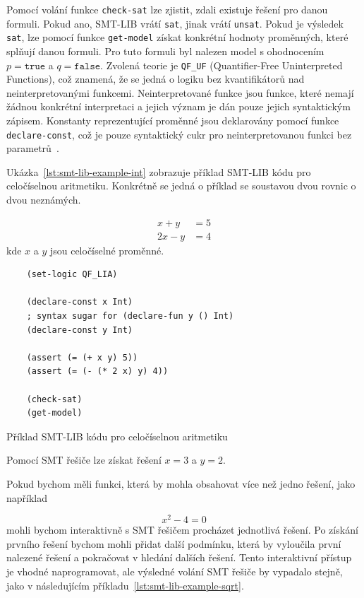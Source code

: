 Pomocí volání funkce \texttt{check-sat} lze zjistit, zdali existuje řešení pro danou formuli.
Pokud ano, SMT-LIB vrátí \texttt{sat}, jinak vrátí \texttt{unsat}.
Pokud je výsledek \texttt{sat}, lze pomocí funkce \texttt{get-model} získat konkrétní hodnoty proměnných, které splňují danou formuli.
Pro tuto formuli byl nalezen model s ohodnocením $p = \texttt{true}$ a $q = \texttt{false}$.
Zvolená teorie je \texttt{QF\_UF} (Quantifier-Free Uninterpreted Functions),
což znamená, že se jedná o logiku bez kvantifikátorů nad neinterpretovanými funkcemi.
Neinterpretované funkce jsou funkce, které nemají žádnou konkrétní interpretaci a jejich význam je dán pouze jejich syntaktickým zápisem.
Konstanty reprezentující proměnné jsou deklarovány pomocí funkce \texttt{declare-const},
což je pouze syntaktický cukr pro neinterpretovanou funkci bez parametrů~\cite{SMTLIB}.

Ukázka~\ref{lst:smt-lib-example-int} zobrazuje příklad SMT-LIB kódu pro celočíselnou aritmetiku.
Konkrétně se jedná o příklad se soustavou dvou rovnic o dvou neznámých.

\begin{align*}
    x + y &= 5 \\
    2x - y &= 4
\end{align*}
kde $x$ a $y$ jsou celočíselné proměnné.

\begin{listing}[H]
    \begin{verbatim}
    (set-logic QF_LIA)

    (declare-const x Int)
    ; syntax sugar for (declare-fun y () Int)
    (declare-const y Int)

    (assert (= (+ x y) 5))
    (assert (= (- (* 2 x) y) 4))

    (check-sat)
    (get-model)
    \end{verbatim}
    \caption{Příklad SMT-LIB kódu pro celočíselnou aritmetiku}
    \label{lst:smt-lib-example-int}
\end{listing}

Pomocí SMT řešiče lze získat řešení $x = 3$ a $y = 2$.

Pokud bychom měli funkci, která by mohla obsahovat více než jedno řešení,
jako například

\begin{equation*}
    x^2 - 4 = 0
\end{equation*}
mohli bychom interaktivně s SMT řešičem procházet jednotlivá řešení.
Po získání prvního řešení bychom mohli přidat další podmínku, která by vyloučila
první nalezené řešení a pokračovat v hledání dalších řešení.
Tento interaktivní přístup je vhodné naprogramovat, ale výsledné volání SMT řešiče
by vypadalo stejně, jako v následujícím příkladu~\ref{lst:smt-lib-example-sqrt}.

